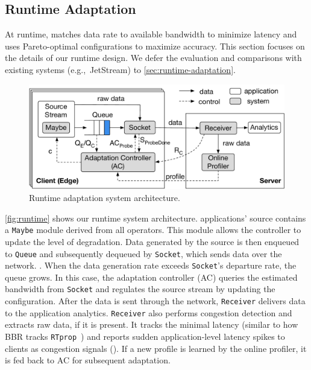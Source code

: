 \subsection{Runtime Adaptation}
\label{sec:runtime}

At runtime, \sysname{} matches data rate to available bandwidth to minimize
latency and uses Pareto-optimal configurations to maximize accuracy. This
section focuses on the details of our runtime design. We defer the evaluation
and comparisons with existing systems (e.g.,~JetStream) to
\autoref{sec:runtime-adaptation}.

\begin{figure}
  \centering
  \includegraphics[width=\linewidth]{figures/runtime-adaptation.pdf}
  \caption{Runtime adaptation system architecture.}
  \label{fig:runtime}
\end{figure}

\autoref{fig:runtime} shows our runtime system architecture. \sysname{}
applications' source contains a \texttt{Maybe} module derived from all \maybe{}
operators. This module allows the controller to update the level of
degradation. Data generated by the source is then enqueued to \texttt{Queue} and
subsequently dequeued by \texttt{Socket}, which sends data over the
network. . When the data generation rate exceeds
\texttt{Socket}'s departure rate, the queue grows. In this case, the adaptation
controller (AC) queries the estimated bandwidth from \texttt{Socket} and
regulates the source stream by updating the configuration. After the data is
sent through the network, \texttt{Receiver} delivers data to the application
analytics. \texttt{Receiver} also performs congestion detection and extracts raw
data, if it is present.  It tracks the minimal latency (similar to how BBR
tracks \texttt{RTprop}~\cite{cardwell2017bbr}) and reports sudden
application-level latency spikes to clients as congestion signals (\rc{}). If a
new profile is learned by the online profiler, it is fed back to AC for
subsequent adaptation.


